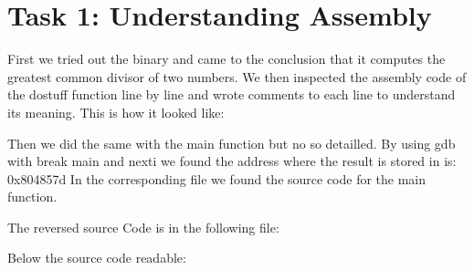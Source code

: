 \section{Task 1: Understanding Assembly}

First we tried out the binary and came to the conclusion that it computes the greatest common divisor of two numbers.
We then inspected the assembly code of the dostuff function line by line and wrote comments to each line to understand its meaning. This is how it looked like:



Then we did the same with the main function but no so detailled. By using gdb with break main and nexti we found the address where the result is stored in is: 0x804857d
In the corresponding file we found the source code for the main function.

The reversed source Code is in the following file: 

Below the source code readable:

